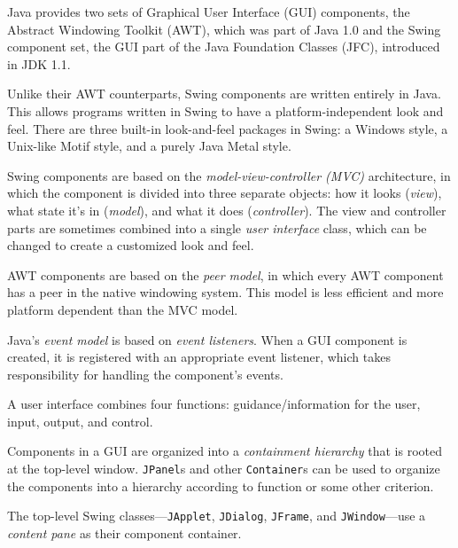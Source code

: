 \begin{SMBL}
\item  Java provides two sets of Graphical User Interface
(GUI) components, the Abstract Windowing Toolkit (AWT), which was part
of Java 1.0 and the Swing component set, the
GUI part of the Java Foundation Classes (JFC), introduced in JDK 1.1.

\item  Unlike their AWT counterparts, Swing components are written
entirely in Java. This allows programs written in Swing to have
a platform-independent look and feel. There are three built-in
look-and-feel packages in Swing: a Windows  style, a Unix-like
Motif style, and a purely Java Metal style.

\item  Swing components are based on the {\it model-view-controller (MVC)}
architecture, in which the component is divided into three separate
objects: how it looks ({\it view}), what state it's in ({\it model}),
and what it does ({\it controller}). The view and controller parts are
sometimes combined into a single {\it user interface} class, which can
be changed to create a customized look and feel.

\item  AWT components are based on the {\it peer model}, in which
every AWT component has a peer in the native windowing system. This
model is less efficient and more platform dependent than the MVC model.

\item  Java's {\it event model} is based on {\it event listeners}. When
a GUI component is created, it is registered with an appropriate event
listener, which takes responsibility for handling the component's events.

\item  A user interface combines four functions: guidance/information for the user,
input, output, and control.

\item  Components in a GUI are organized into a {\it containment
hierarchy} that is rooted at the top-level window. {\tt JPanel}s and other
{\tt Container}s can be used to organize the components into a hierarchy
according to function or some other criterion.

\item  The top-level Swing classes---{\tt JApplet}, {\tt JDialog},
{\tt JFrame}, and {\tt JWindow}---use a {\it content pane} as their
component container.


\end{SMBL}

